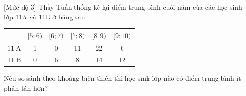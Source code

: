 \begin{bt}%
[Mức độ 3]
Thầy Tuấn thống kê lại điểm trung bình cuối năm của các học sinh lớp 11A và 11B ở bảng sau:
\begin{center}
	\begin{tabular}{|c|c|c|c|c|c|}
		\hline \diagbox {Lớp}{Điểm trung bình} & {$[5 ; 6)$} & {$[6 ; 7)$} & {$[7 ; 8)$} & {$[8 ; 9)$} & {$[9 ; 10)$} \\
		\hline $11 \mathrm{~A}$ & 1 & 0 & 11 & 22 & 6 \\
		\hline $11 \mathrm{~B}$ & 0 & 6 & 8 & 14 & 12 \\
		\hline
	\end{tabular}
\end{center}
Nếu so sánh theo khoảng biến thiên thì học sinh lớp nào có điểm trung bình ít phân tán hơn?
\end{bt}

